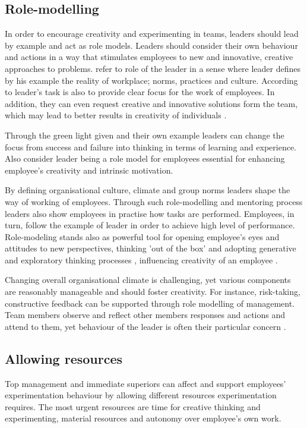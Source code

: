 \subsection{Role-modelling}
In order to encourage creativity and experimenting in teams, leaders should lead by example and act as role models. Leaders should consider their own behaviour and actions in a way that stimulates employees to new and innovative, creative approaches to problems. \citep{mumford2002leading,amabile2008creativity,waldman1990adding} \citet{katz1978social} refer to role of the leader in a sense where leader defines by his example the reality of workplace; norms, practices and culture. According to \citet{barczak1989leadership} leader's task is also to provide clear focus for the work of employees. In addition, they can even request creative and innovative solutions form the team, which may lead to better results in creativity of individuals \citep{amabile2002creativity}. 

Through the green light given and their own example leaders can change the focus from success and failure into thinking in terms of learning and experience. \citep{farson2002failuretolerantleader} Also \citet{amabile2004leader} consider leader being a role model for employees essential for enhancing employee's creativity and intrinsic motivation. 

By defining organisational culture, climate and group norms leaders shape the way of working of employees. Through such role-modelling and mentoring process leaders also show employees in practise how tasks are performed. Employees, in turn, follow the example of leader in order to achieve high level of performance. \citep{redmond1993putting} Role-modeling stands also as powerful tool for opening employee's eyes and attitudes to new perspectives, thinking 'out of the box' and adopting generative and exploratory thinking processes \citep{jung2003role,sternberg1997creativity}, influencing creativity of an employee \citep{shalley2004leaders}.

Changing overall organisational climate is challenging, yet various components are reasonably manageable and should foster creativity. For instance, risk-taking, constructive feedback can be supported through role modelling of management. \citep{shalley2004leaders} Team members observe and reflect other members responses and actions and attend to them, yet behaviour of the leader is often their particular concern \citep{tyler1992relational}.

\subsection{Allowing resources}
Top management and immediate superiors can affect and support employees' experimentation behaviour by allowing different resources experimentation requires. The most urgent resources are time for creative thinking and experimenting, material resources and autonomy over employee's own work\citet{amabile2008creativity,katz1985project}. 

